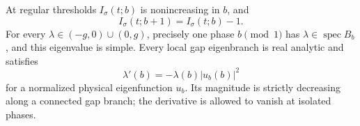 \begin{theorem}
\label{boundary:thm:one-cell-flow}
At regular thresholds $I_\sigma(t;b)$ is nonincreasing in $b$, and
\begin{equation}\label{boundary:eq:index-period}
 I_\sigma(t;b+1)=I_\sigma(t;b)-1.
\end{equation}
For every $\lambda\in(-g,0)\cup(0,g)$, precisely one phase
$b\pmod1$ has $\lambda\in\operatorname{spec}B_b$, and this eigenvalue
is simple.  Every local gap eigenbranch is real analytic and satisfies
\begin{equation}\label{boundary:eq:hadamard}
 \lambda'(b)=-\lambda(b)|u_b(b)|^2
\end{equation}
for a normalized physical eigenfunction $u_b$.  Its magnitude is
strictly decreasing along a connected gap branch; the derivative is
allowed to vanish at isolated phases.
\end{theorem}

